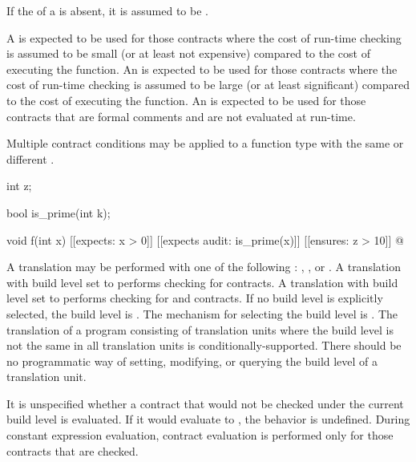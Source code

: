 \pnum
If the 
of a  is absent,
it is assumed to be .
\begin{note}
A   is expected to be used
for those contracts where
the cost of run-time checking is assumed to be
small (or at least not expensive) compared to
the cost of executing the function.
An   is expected to be used
for those contracts where
the cost of run-time checking is assumed to be
large (or at least significant) compared to
the cost of executing the function.
An   is expected to be used
for those contracts that are formal comments
and are not evaluated at run-time.
\end{note}

\pnum
Multiple contract conditions may be applied to a function type
with the same or different .
\begin{example}
\begin{codeblock}
int z;

bool is_prime(int k);

void f(int x)
  [[expects: x > 0]]
  [[expects audit: is_prime(x)]]
  [[ensures: z > 10]]
{
  @\commentellip@
}
\end{codeblock}
\end{example}

\pnum
A translation may be performed
with one of the following :
, , or .
A translation with build level set to 
performs checking for  contracts.
A translation with build level set to 
performs checking for  and  contracts.
If no build level is explicitly selected, the build level is .
The mechanism for selecting the build level is
.
The translation of a program consisting of translation units
where the build level is not the same in all translation units
is conditionally-supported.
There should be no programmatic way of setting, modifying, or querying
the build level of a translation unit.

\pnum
It is unspecified whether a contract
that would not be checked under the current build level is evaluated.
If it would evaluate to , the behavior is undefined.
During constant expression evaluation,
contract evaluation is performed only for those contracts that are checked.

